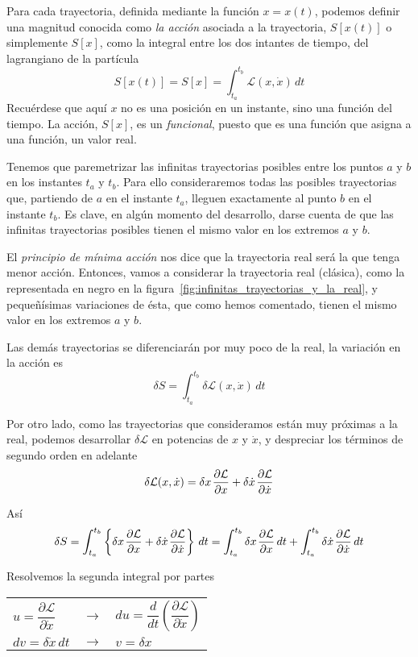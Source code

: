 Para cada trayectoria, definida mediante la función $x=x(t)$, podemos
definir una magnitud conocida como \emph{la acción} asociada a la
trayectoria, $S[x(t)]$ o simplemente $S[x]$, como la integral entre
los dos intantes de tiempo, del lagrangiano de la partícula
\[
  S[x(t)] = S[x] = \int_{t_a}^{t_b} \mathcal{L}(x,\dot{x})\,dt
\]
Recuérdese que aquí $x$ no es una posición en un instante, sino una
función del tiempo. La acción, $S[x]$, es un \emph{funcional}, puesto
que es una función que asigna a una función, un valor real.

Tenemos que paremetrizar las infinitas trayectorias posibles entre los
puntos $a$ y $b$ en los instantes $t_a$ y $t_b$.  Para ello
consideraremos todas las posibles trayectorias que, partiendo de $a$
en el instante $t_a$, lleguen exactamente al punto $b$ en el instante
$t_b$. Es clave, en algún momento del desarrollo, darse cuenta de que
las infinitas trayectorias posibles tienen el mismo valor en los
extremos $a$ y $b$.

El \emph{principio de mínima acción} nos dice que la trayectoria real
será la que tenga menor acción.  Entonces, vamos a considerar la
trayectoria real (clásica), como la representada en negro en la
figura~\ref{fig:infinitas_trayectorias_y_la_real}, y pequeñísimas
variaciones de ésta, que como hemos comentado, tienen el mismo valor
en los extremos $a$ y $b$.

Las demás trayectorias se diferenciarán por muy poco de la real, la variación
en la acción es
\[
  \delta S = \int_{t_a}^{t_b}\delta\mathcal{L}(x,\dot{x})\,dt
\]

Por otro lado, como las trayectorias que consideramos están muy
próximas a la real, podemos desarrollar $\delta\mathcal{L}$ en
potencias de $x$ y $\dot{x}$, y despreciar los términos de segundo
orden en adelante
\[
  \delta\mathcal{L}(x,\dot{x})
  =
  \delta x\kern1pt\dfrac{\partial\mathcal{L}}{\partial x}
  +
  \delta\dot{x}\kern1pt\dfrac{\partial\mathcal{L}}{\partial\dot{x}}
\]

Así
\[
  \delta S
  =
  \int_{t_a}^{t_b} \left\{
    \delta x\kern1pt\dfrac{\partial\mathcal{L}}{\partial x}
    + \delta\dot{x}\kern1pt\dfrac{\partial\mathcal{L}}{\partial\dot{x}}
  \right\}\,dt
  =
  \int_{t_a}^{t_b} 
    \delta x\kern1pt\dfrac{\partial\mathcal{L}}{\partial x}\,dt
    +
    \int_{t_a}^{t_b} \delta\dot{x}\kern1pt\dfrac{\partial\mathcal{L}}{\partial\dot{x}}\,dt
\]

Resolvemos la segunda integral por partes

\smallskip
\begin{center}
\begin{tabular}{lcl}
  $u = \dfrac{\partial\mathcal{L}}{\partial\dot{x}}$
  &$\longrightarrow$
  &$du = \dfrac{d}{dt} \left(\dfrac{\partial\mathcal{L}}{\partial\dot{x}}\right)$\\
  $dv = \delta\dot{x}\,dt$
  &$\longrightarrow$
  &$v=\delta x$
\end{tabular}
\end{center}

